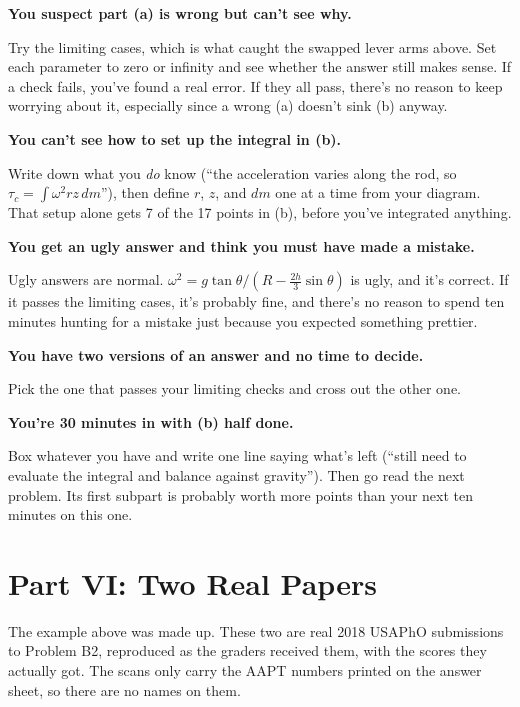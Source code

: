 \documentclass[11pt]{article}
\newcommand{\Q}[1]{\par\medskip\noindent\textbf{\color{qblue}#1}\par\nobreak\vspace{1pt}\nobreak}
\begin{document}
\Q{You suspect part (a) is wrong but can't see why.}
Try the limiting cases, which is what caught the swapped lever arms above. Set each
parameter to zero or infinity and see whether the answer still makes sense. If a check
fails, you've found a real error. If they all pass, there's no reason to keep worrying about
it, especially since a wrong (a) doesn't sink (b) anyway.

\Q{You can't see how to set up the integral in (b).}
Write down what you \emph{do} know (``the acceleration varies along the rod, so
$\tau_c = \int \omega^2 r z \, dm$''), then define $r$, $z$, and $dm$ one at a time from
your diagram. That setup alone gets 7 of the 17 points in (b), before you've integrated
anything.

\Q{You get an ugly answer and think you must have made a mistake.}
Ugly answers are normal. $\omega^2 = g\tan\theta/(R - \tfrac{2h}{3}\sin\theta)$ is ugly,
and it's correct. If it passes the limiting cases, it's probably fine, and there's no reason
to spend ten minutes hunting for a mistake just because you expected something prettier.

\Q{You have two versions of an answer and no time to decide.}
Pick the one that passes your limiting checks and cross out the other one.

\Q{You're 30 minutes in with (b) half done.}
Box whatever you have and write one line saying what's left (``still need to evaluate the
integral and balance against gravity''). Then go read the next problem. Its first subpart
is probably worth more points than your next ten minutes on this one.

\section{Part VI: Two Real Papers}

The example above was made up. These two are real 2018 USAPhO submissions to Problem B2,
reproduced as the graders received them, with the scores they actually got. The scans only
carry the AAPT numbers printed on the answer sheet, so there are no names on them.
\end{document}
